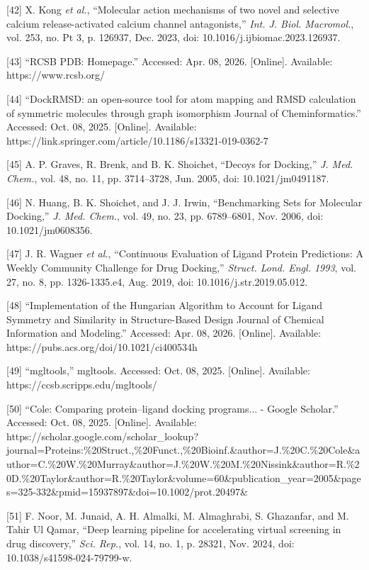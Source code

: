{[}42{]} X. Kong \emph{et al.}, ``Molecular action mechanisms of two novel and selective calcium release-activated calcium channel antagonists,'' \emph{Int. J. Biol. Macromol.}, vol. 253, no. Pt 3, p. 126937, Dec. 2023, doi: 10.1016/j.ijbiomac.2023.126937.

{[}43{]} ``RCSB PDB: Homepage.'' Accessed: Apr. 08, 2026. {[}Online{]}. Available: https://www.rcsb.org/

{[}44{]} ``DockRMSD: an open-source tool for atom mapping and RMSD calculation of symmetric molecules through graph isomorphism \textbar{} Journal of Cheminformatics.'' Accessed: Oct. 08, 2025. {[}Online{]}. Available: https://link.springer.com/article/10.1186/s13321-019-0362-7

{[}45{]} A. P. Graves, R. Brenk, and B. K. Shoichet, ``Decoys for Docking,'' \emph{J. Med. Chem.}, vol. 48, no. 11, pp. 3714--3728, Jun. 2005, doi: 10.1021/jm0491187.

{[}46{]} N. Huang, B. K. Shoichet, and J. J. Irwin, ``Benchmarking Sets for Molecular Docking,'' \emph{J. Med. Chem.}, vol. 49, no. 23, pp. 6789--6801, Nov. 2006, doi: 10.1021/jm0608356.

{[}47{]} J. R. Wagner \emph{et al.}, ``Continuous Evaluation of Ligand Protein Predictions: A Weekly Community Challenge for Drug Docking,'' \emph{Struct. Lond. Engl. 1993}, vol. 27, no. 8, pp. 1326-1335.e4, Aug. 2019, doi: 10.1016/j.str.2019.05.012.

{[}48{]} ``Implementation of the Hungarian Algorithm to Account for Ligand Symmetry and Similarity in Structure-Based Design \textbar{} Journal of Chemical Information and Modeling.'' Accessed: Apr. 08, 2026. {[}Online{]}. Available: https://pubs.acs.org/doi/10.1021/ci400534h

{[}49{]} ``mgltools,'' mgltools. Accessed: Oct. 08, 2025. {[}Online{]}. Available: https://ccsb.scripps.edu/mgltools/

{[}50{]} ``Cole: Comparing protein--ligand docking programs... - Google Scholar.'' Accessed: Oct. 08, 2025. {[}Online{]}. Available: https://scholar.google.com/scholar\_lookup?journal=Proteins:\%20Struct.,\%20Funct.,\%20Bioinf.\&author=J.\%20C.\%20Cole\&author=C.\%20W.\%20Murray\&author=J.\%20W.\%20M.\%20Nissink\&author=R.\%20D.\%20Taylor\&author=R.\%20Taylor\&volume=60\&publication\_year=2005\&pages=325-332\&pmid=15937897\&doi=10.1002/prot.20497\&

{[}51{]} F. Noor, M. Junaid, A. H. Almalki, M. Almaghrabi, S. Ghazanfar, and M. Tahir Ul Qamar, ``Deep learning pipeline for accelerating virtual screening in drug discovery,'' \emph{Sci. Rep.}, vol. 14, no. 1, p. 28321, Nov. 2024, doi: 10.1038/s41598-024-79799-w.

